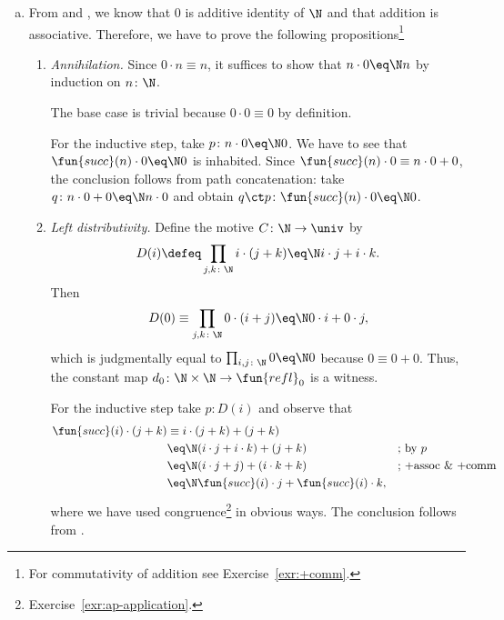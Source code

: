 \begin{solution}
\begin{enumerate}[a)]
        \item From  and , we know that $0$ is additive identity of $\N$ and that addition is associative. Therefore, we have to prove the following propositions\footnote{For commutativity of addition see Exercise~\ref{exr:+comm}.}
        \begin{enumerate}[1.]
            \item \textit{Annihilation.} Since $0\cdot n\equiv n$, it suffices to show that $n\cdot0\eq\N n$ by induction on $n\colon\N$.

            The base case is trivial because $0\cdot0\equiv0$ by definition.
            
            For the inductive step, take $p\colon n\cdot0\eq\N0$. We have to see that $\fun{succ}(n)\cdot0\eq\N0$ is inhabited. Since $\fun{succ}(n)\cdot0\equiv n\cdot0+0$, the conclusion follows from path concatenation: take $q\colon n\cdot0+0\eq\N n\cdot0$ and obtain $q\ct p\colon\fun{succ}(n)\cdot0\eq\N0$.

            \item \textit{Left distributivity.} Define the motive $C\colon\N\to\univ$ by
            \[
                D(i)\defeq\prod_{j,k\colon\N}i\cdot(j+k)\eq\N i\cdot j+i\cdot k.
            \]
            Then
            \[
                D(0)\equiv\prod_{j,k\colon\N}0\cdot(i+j)\eq\N0\cdot i+0\cdot j,
            \]
            which is judgmentally equal to $\prod_{i,j\colon\N}0\eq\N0$ because $0\equiv0+0$. Thus, the constant map $d_0\colon\N\times\N\to\fun{refl}_0$ is a witness.

            For the inductive step take $p\colon D(i)$ and observe that
            \begin{align*}
                \fun{succ}(i)\cdot(j+k) &\equiv i\cdot(j+k)+(j+k)\\
                    &\eq\N (i\cdot j+i\cdot k)+(j+k)
                        &&\text{; by }p\\
                    &\eq\N (i\cdot j+j)+(i\cdot k+k)
                        &&\text{; +assoc \& +comm}\\
                    &\eq\N \fun{succ}(i)\cdot j+\fun{succ}(i)\cdot k,
            \end{align*}
            where we have used congruence\footnote{Exercise~\ref{exr:ap-application}.} in obvious ways. The conclusion follows from .


\end{enumerate}
\end{enumerate}
\end{solution}
